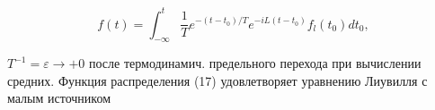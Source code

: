 \documentclass[10pt]{article}
\begin{document}
\[

f(t)=\int_{-\infty}^{t} \frac{1}{T} e^{-\left(t-t_{0}\right) / T} e^{-i L\left(t-t_{0}\right)} f_{l}\left(t_{0}\right) d t_{0},

\]



$T^{-1}=\varepsilon \rightarrow+0$ после термодинамич. предельного перехода при вычислении средних. Функция распределения (17) удовлетворяет уравнению Лиувилля с малым источником
\end{document}
